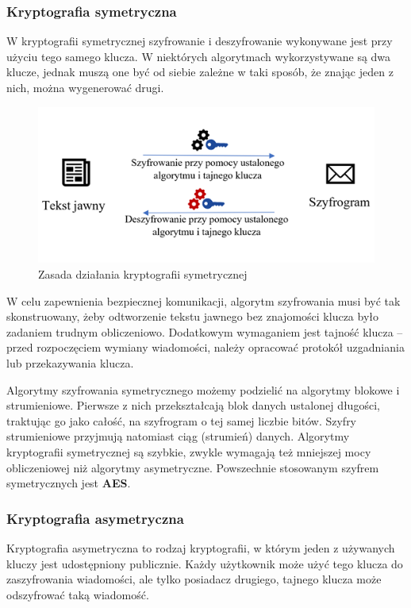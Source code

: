 \documentclass[a4paper,12pt,oneside]{book}
\begin{document}
\subsubsection{Kryptografia symetryczna}

W kryptografii symetrycznej szyfrowanie i deszyfrowanie wykonywane jest przy użyciu tego samego klucza. W niektórych algorytmach wykorzystywane są dwa klucze, jednak muszą one być od siebie zależne w taki sposób, że znając jeden z nich, można wygenerować drugi.

\begin{figure}[h!]
	\centering\includegraphics[scale=0.45]{krypt_sym.png}
	\caption{Zasada działania kryptografii symetrycznej}
\end{figure}

W celu zapewnienia bezpiecznej komunikacji, algorytm szyfrowania musi być tak skonstruowany, żeby odtworzenie tekstu jawnego bez znajomości klucza było zadaniem trudnym obliczeniowo. Dodatkowym wymaganiem jest tajność klucza – przed rozpoczęciem wymiany wiadomości, należy opracować protokół uzgadniania lub przekazywania klucza.

Algorytmy szyfrowania symetrycznego możemy podzielić na algorytmy blokowe i strumieniowe. Pierwsze z nich przekształcają blok danych ustalonej długości, traktując go jako całość, na szyfrogram o tej samej liczbie bitów. Szyfry strumieniowe przyjmują natomiast ciąg (strumień) danych. Algorytmy kryptografii symetrycznej są szybkie, zwykle wymagają też mniejszej mocy obliczeniowej niż algorytmy asymetryczne. Powszechnie stosowanym szyfrem symetrycznych jest \textbf{AES}.

\subsubsection{Kryptografia asymetryczna}

Kryptografia asymetryczna to rodzaj kryptografii, w którym jeden z używanych kluczy jest udostępniony publicznie. Każdy użytkownik może użyć tego klucza do zaszyfrowania wiadomości, ale tylko posiadacz drugiego, tajnego klucza może odszyfrować taką wiadomość.
\end{document}
